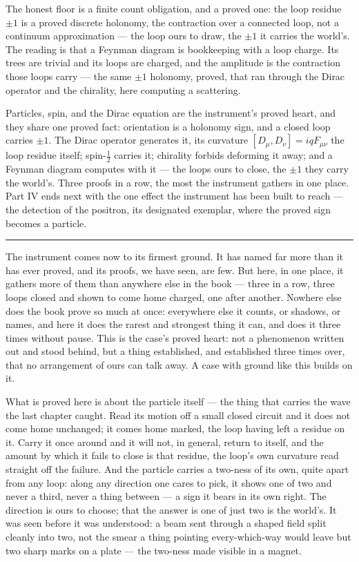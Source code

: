 The honest floor is a finite count obligation, and a proved one: the loop residue $\pm 1$ is a proved discrete
holonomy, the contraction over a connected loop, not a continuum approximation --- the loop ours to draw, the
$\pm 1$ it carries the world's. The reading is that a Feynman diagram is bookkeeping with a loop charge. Its trees are trivial and its loops are charged, and the amplitude
is the contraction those loops carry --- the same $\pm 1$ holonomy, proved, that ran through the Dirac operator
and the chirality, here computing a scattering.

\bigskip

Particles, spin, and the Dirac equation are the instrument's proved heart, and they share one proved fact:
orientation is a holonomy sign, and a closed loop carries $\pm 1$. The Dirac operator generates it, its
curvature $[D_\mu, D_\nu] = iq F_{\mu\nu}$ the loop residue itself; spin-$\tfrac12$ carries it; chirality
forbids deforming it away; and a Feynman diagram computes with it --- the loops ours to close, the $\pm 1$ they
carry the world's. Three proofs in a row, the most the instrument
gathers in one place. Part IV ends next with the one effect the instrument has been built to reach --- the
detection of the positron, its designated exemplar, where the proved sign becomes a particle.

\bigskip
\begin{center}
\rule{0.4\textwidth}{0.4pt}
\end{center}
\bigskip

\noindent The instrument comes now to its firmest ground. It has named far more than it has ever proved, and its
proofs, we have seen, are few. But here, in one place, it gathers more of them than anywhere else in the book
--- three in a row, three loops closed and shown to come home charged, one after another. Nowhere else does the book
prove so much at once: everywhere else it counts, or shadows, or names, and here it does the rarest and
strongest thing it can, and does it three times without pause. This is the case's proved heart: not a phenomenon written out and stood behind, but a thing established, and established three times
over, that no arrangement of ours can talk away. A case with ground like this builds on it.

What is proved here is about the particle itself --- the thing that carries the wave the last chapter caught.
Read its motion off a small closed circuit and it does not come home unchanged; it comes home marked, the loop
having left a residue on it. Carry it once around and it will not, in general, return to itself, and the amount
by which it fails to close is that residue, the loop's own curvature read straight off the failure. And the
particle carries a two-ness of its own, quite apart from any loop: along any direction one cares to pick, it
shows one of two and never a third, never a thing between --- a sign it bears in its own right. The direction is
ours to choose; that the answer is one of just two is the world's. It was seen before it was understood: a beam
sent through a shaped field split cleanly into two, not the smear a thing pointing every-which-way would leave
but two sharp marks on a plate --- the two-ness made visible in a magnet.

